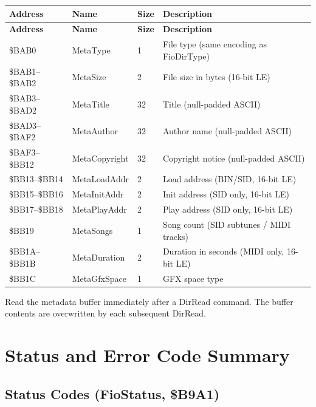 \begin{center}
\small
\begin{longtable}{@{}lllp{7.5cm}@{}}
\toprule
\textbf{Address} & \textbf{Name} & \textbf{Size} & \textbf{Description} \\
\midrule
\endfirsthead
\toprule
\textbf{Address} & \textbf{Name} & \textbf{Size} & \textbf{Description} \\
\midrule
\endhead
\$BAB0 & MetaType      & 1  & File type (same encoding as FioDirType) \\
\$BAB1--\$BAB2 & MetaSize & 2 & File size in bytes (16-bit LE) \\
\$BAB3--\$BAD2 & MetaTitle & 32 & Title (null-padded ASCII) \\
\$BAD3--\$BAF2 & MetaAuthor & 32 & Author name (null-padded ASCII) \\
\$BAF3--\$BB12 & MetaCopyright & 32 & Copyright notice (null-padded ASCII) \\
\$BB13--\$BB14 & MetaLoadAddr & 2 & Load address (BIN/SID, 16-bit LE) \\
\$BB15--\$BB16 & MetaInitAddr & 2 & Init address (SID only, 16-bit LE) \\
\$BB17--\$BB18 & MetaPlayAddr & 2 & Play address (SID only, 16-bit LE) \\
\$BB19 & MetaSongs     & 1  & Song count (SID subtunes / MIDI tracks) \\
\$BB1A--\$BB1B & MetaDuration & 2 & Duration in seconds (MIDI only, 16-bit LE) \\
\$BB1C & MetaGfxSpace  & 1  & GFX space type \\
\bottomrule
\end{longtable}
\end{center}

\begin{tipbox}
Read the metadata buffer immediately after a DirRead command.  The buffer
contents are overwritten by each subsequent DirRead.
\end{tipbox}


\section{Status and Error Code Summary}
\label{sec:fio-status}

\subsection{Status Codes (FioStatus, \$B9A1)}

